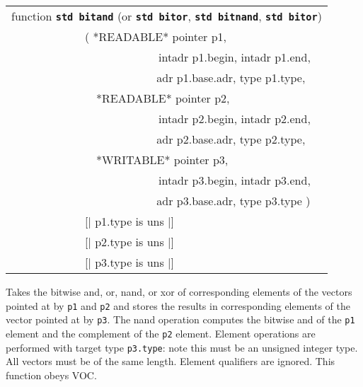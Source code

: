 \documentclass[12pt]{article}
\makeatletter
\newcommand{\TT}[1]{{\tt \bfseries #1}}
\newcommand{\ttstdmkey}[2]{\TT{std #1}\index{#1@{\tt std #1}!#2}}
\newenvironment{indpar}[1][0.3in]%
	{\begin{list}{}%
		     {\setlength{\itemsep}{0in}%
		      \setlength{\topsep}{0in}%
		      \setlength{\parsep}{1ex}%
		      \setlength{\labelwidth}{#1}%
		      \setlength{\leftmargin}{#1}%
		      \addtolength{\leftmargin}{\labelsep}}%
	 \item}%
	{\end{list}}
\makeatother
\begin{document}
\begin{indpar}
{\tt\begin{tabular}{@{}l}
function \ttstdmkey{bitand}{vectors} {\rm (or \ttstdmkey{bitor}{vectors},
					   \ttstdmkey{bitnand}{vectors},
					   \ttstdmkey{bitor}{vectors})} \\
~~~~~~~~~~~~~( *READABLE* pointer p1, \\
~~~~~~~~~~~~~~~~~~~~~~~~~~intadr p1.begin, intadr p1.end, \\
~~~~~~~~~~~~~~~~~~~~~~~~~ adr p1.base.adr, type p1.type, \\
~~~~~~~~~~~~~~~*READABLE* pointer p2, \\
~~~~~~~~~~~~~~~~~~~~~~~~~~intadr p2.begin, intadr p2.end, \\
~~~~~~~~~~~~~~~~~~~~~~~~~ adr p2.base.adr, type p2.type, \\
~~~~~~~~~~~~~~~*WRITABLE* pointer p3, \\
~~~~~~~~~~~~~~~~~~~~~~~~~~intadr p3.begin, intadr p3.end, \\
~~~~~~~~~~~~~~~~~~~~~~~~~ adr p3.base.adr, type p3.type ) \\
~~~~~~~~~~~~~[| p1.type is uns |] \\
~~~~~~~~~~~~~[| p2.type is uns |] \\
~~~~~~~~~~~~~[| p3.type is uns |] \\
\end{tabular}}

\begin{indpar}
Takes the bitwise and, or, nand, or xor
of corresponding elements of the vectors pointed
at by {\tt p1} and {\tt p2}
and stores the results in corresponding elements of
the vector pointed at by {\tt p3}.  The nand operation computes
the bitwise and of the {\tt p1} element and the complement of the
{\tt p2} element.
Element operations are
performed with target type {\tt p3.type}: note this must be an unsigned
integer type.  All vectors must be of the same length.
Element qualifiers are ignored.
This function obeys VOC.
\end{indpar}


\end{indpar}
\end{document}
